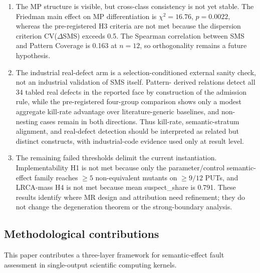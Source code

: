 \documentclass[manuscript,screen,review]{acmart}
\begin{document}
\begin{enumerate}
\item
  The MP structure is visible, but cross-class consistency is not yet
  stable. The Friedman main effect on MP differentiation is
  \(\chi^2 = 16.76\), \(p = 0.0022\), whereas the pre-registered H3
  criteria are not met because the dispersion criterion
  CV(\(\Delta\)SMS) exceeds 0.5. The Spearman correlation between SMS
  and Pattern Coverage is 0.163 at \(n = 12\), so orthogonality remains
  a future hypothesis.
\item
  The industrial real-defect arm is a selection-conditioned external
  sanity check, not an industrial validation of SMS itself. Pattern-
  derived relations detect all 34 tabled real defects in the reported
  face by construction of the admission rule, while the pre-registered
  four-group comparison shows only a modest aggregate kill-rate
  advantage over literature-generic baselines, and non-nesting cases
  remain in both directions. Thus kill-rate, semantic-stratum alignment,
  and real-defect detection should be interpreted as related but distinct
  constructs, with industrial-code evidence used only at result level.
\item
  The remaining failed thresholds delimit the current instantiation.
  Implementability H1 is not met because only the parameter/control
  semantic-effect family reaches \(\geq 5\) non-equivalent mutants on
  \(\geq 9/12\) PUTs, and
  LRCA-mass H4 is not met because mean suspect\_share is 0.791. These
  results identify where MR design and attribution need refinement; they
  do not change the degeneration theorem or the strong-boundary
  analysis.
\end{enumerate}

\subsection{Methodological contributions}\label{methodological-contributions}

This paper contributes a three-layer framework for semantic-effect fault
assessment in single-output scientific computing kernels.
\end{document}
